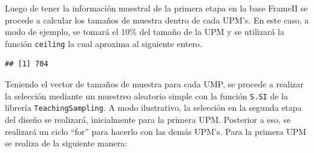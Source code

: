 \documentclass[
  12pt,
]{book}
\newenvironment{Shaded}{\begin{snugshade}}{\end{snugshade}}
\newcommand{\AttributeTok}[1]{\textcolor[rgb]{0.13,0.29,0.53}{#1}}
\newcommand{\FloatTok}[1]{\textcolor[rgb]{0.00,0.00,0.81}{#1}}
\newcommand{\FunctionTok}[1]{\textcolor[rgb]{0.13,0.29,0.53}{\textbf{#1}}}
\newcommand{\NormalTok}[1]{#1}
\newcommand{\OtherTok}[1]{\textcolor[rgb]{0.56,0.35,0.01}{#1}}
\newcommand{\SpecialCharTok}[1]{\textcolor[rgb]{0.81,0.36,0.00}{\textbf{#1}}}
\begin{document}
Luego de tener la información muestral de la primera etapa en la base FrameII se procede a calcular los tamaños de muestra dentro de cada UPM's. En este caso, a modo de ejemplo, se tomará el 10\% del tamaño de la UPM y se utilizará la función \texttt{ceiling} la cual aproxima al siguiente entero.

\begin{Shaded}
\end{Shaded}

\begin{verbatim}
## [1] 704
\end{verbatim}

Teniendo el vector de tamaños de muestra para cada UMP, se procede a realizar la selección mediante un muestreo aleatorio simple con la función \texttt{S.SI} de la librería \texttt{TeachingSampling}. A modo ilustrativo, la selección en la segunda etapa del diseño se realizará, inicialmente para la primera UPM. Posterior a eso, se realizará un ciclo ``for'' para hacerlo con las demás UPM's. Para la primera UPM se realiza de la siguiente manera:
\end{document}
